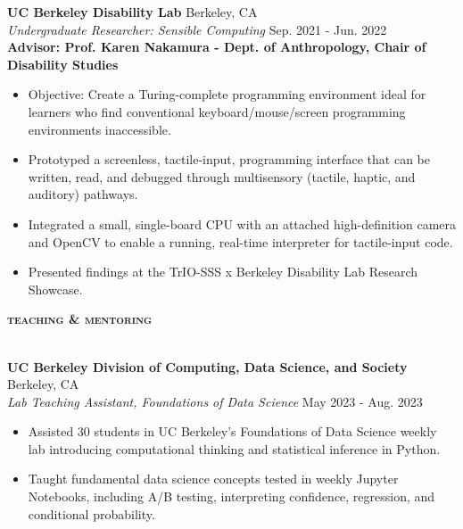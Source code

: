 \documentclass[a4paper]{article}
\newcommand{\lineunder} {
    \vspace*{-8pt} \\
    \hspace*{-18pt} \hrulefill \\
}
\newcommand{\header} [1] {
    {\hspace*{-18pt}\vspace*{6pt} \large{\textbf{\textsc{\MakeLowercase{#1}}}}}
    \vspace*{-6pt}\lineunder
}
\begin{document}
\textbf{UC Berkeley Disability Lab} \hfill Berkeley, CA\\
\textit{Undergraduate Researcher: Sensible Computing} \hfill Sep. 2021 - Jun. 2022\\
\vspace{2mm}
\setlength\leftskip{25pt}
\textbf{Advisor: Prof. Karen Nakamura - Dept. of Anthropology, Chair of Disability Studies} \\
\setlength\leftskip{0pt}
\vspace{-2mm}
\begin{itemize}
	\setlength\itemsep{0pt}  %
	\setlength\parskip{0pt}  %
	\setlength\parsep{0pt}  %
	\setlength\leftskip{0pt}  %
	\renewcommand\labelitemi{\tiny$\bullet$} %
    \item Objective: Create a Turing-complete programming environment ideal for learners who find conventional keyboard/mouse/screen programming environments inaccessible.
    \item Prototyped a screenless, tactile-input, programming interface that can be written, read, and debugged through multisensory (tactile, haptic, and auditory) pathways.
    \item Integrated a small, single-board CPU with an attached high-definition camera and OpenCV to enable a running, real-time interpreter for tactile-input code. 
    \item Presented findings at the TrIO-SSS x Berkeley Disability Lab Research Showcase.
\end{itemize}

\vspace{1mm}

\header{Teaching \& Mentoring}
\vspace{2mm}

\textbf{UC Berkeley Division of Computing, Data Science, and Society} \hfill Berkeley, CA\\
\textit{Lab Teaching Assistant, Foundations of Data Science} \hfill May 2023 - Aug. 2023\\
\vspace{-1mm}
\begin{itemize} \itemsep 1pt
	\setlength\itemsep{0pt}  %
	\setlength\parskip{0pt}  %
	\setlength\parsep{0pt}  %
	\setlength\leftskip{0pt}  %
	\renewcommand\labelitemi{\tiny$\bullet$} %
	\item Assisted 30 students in UC Berkeley's Foundations of Data Science weekly lab introducing computational thinking and statistical inference in Python. 
        \item Taught fundamental data science concepts tested in weekly Jupyter Notebooks, including A/B testing, interpreting confidence, regression, and conditional probability.
\end{itemize}
\end{document}
